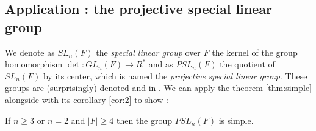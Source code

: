 \subsection{Application : the projective special linear group}

We denote as $SL_n(F)$ the \emph{special linear group} over $F$  the kernel of the group homomorphism $\det : GL_n(F) \to R^*$ and as $PSL_n(F)$ the quotient of $SL_n(F)$ by its center, which is named the \emph{projective special linear group}.
These groups are (surprisingly) denoted  and  in \Lean. We can apply the theorem \ref{thm:simple} alongside with its corollary \ref{cor:2} to show : 

\begin{theoreme}
    If $n \ge 3$ or $n = 2$ and $|F| \ge 4$ then the group $PSL_n\left( F \right)$ is simple.
\end{theoreme}

